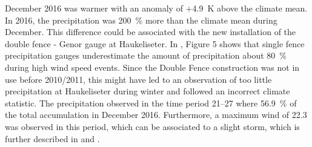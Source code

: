 December 2016 was warmer with an anomaly of +\SI{4.9}{\kelvin} above the climate mean. 
In 2016, the precipitation was \SI{200}{\percent} more than the climate mean during December. This difference could be associated with the new installation of the double fence - Genor gauge at Haukeliseter. In \cite{wolff_derivation_2015}, Figure 5 shows that single fence precipitation gauges underestimate the amount of precipitation about \SI{80}{\percent} during high wind speed events. Since the Double Fence construction was not in use before 2010/2011, this might have led to an observation of too little precipitation at Haukeliseter during winter and followed an incorrect climate statistic.
The precipitation observed in the time period \SIrange{21}{27}{\dec} where \SI{56.9}{\percent} of the total accumulation in December 2016. Furthermore, a maximum wind of \SI{22.3}{\mPs} was observed in this period, which can be associated to a slight storm, which is further described in  and .